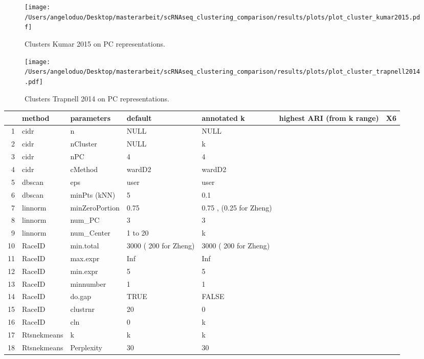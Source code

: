 \documentclass[11pt, a4paper]{article}\usepackage[]{graphicx}\usepackage[]{color}
\begin{document}
\begin{figure}[!h]
\texttt{[image: /Users/angeloduo/Desktop/masterarbeit/scRNAseq\_clustering\_comparison/results/plots/plot\_cluster\_kumar2015.pdf]}
\caption{Clusters Kumar 2015 on PC representations. }
\label{fig:clusterkumar}
\end{figure}

\begin{figure}[!h]
\texttt{[image: /Users/angeloduo/Desktop/masterarbeit/scRNAseq\_clustering\_comparison/results/plots/plot\_cluster\_trapnell2014.pdf]}
\caption{Clusters Trapnell 2014 on PC representations. }
\label{fig:clustertrapnell}
\end{figure}

\clearpage
\begin{table}[ht]
\centering
\begin{tabular}{rllllll}
  \hline
 & method & parameters & default & annotated k & highest ARI (from k range) & X6 \\ 
  \hline
1 & cidr & n & NULL & NULL &  &  \\ 
  2 & cidr & nCluster & NULL & k &  &  \\ 
  3 & cidr & nPC & 4 & 4 &  &  \\ 
  4 & cidr & cMethod & wardD2 & wardD2 &  &  \\ 
  5 & dbscan & eps & user & user &  &  \\ 
  6 & dbscan & minPts (kNN) & 5 & 0.1 &  &  \\ 
  7 & linnorm & minZeroPortion & 0.75 & 0.75 , (0.25 for Zheng) &  &  \\ 
  8 & linnorm & num\_PC & 3 & 3 &  &  \\ 
  9 & linnorm & num\_Center & 1 to 20 & k &  &  \\ 
  10 & RaceID & min.total & 3000 ( 200 for Zheng) & 3000 ( 200 for Zheng) &  &  \\ 
  11 & RaceID & max.expr & Inf & Inf &  &  \\ 
  12 & RaceID & min.expr & 5 & 5 &  &  \\ 
  13 & RaceID & minnumber & 1 & 1 &  &  \\ 
  14 & RaceID & do.gap & TRUE & FALSE &  &  \\ 
  15 & RaceID & clustrnr & 20 & 0 &  &  \\ 
  16 & RaceID & cln & 0 & k &  &  \\ 
  17 & Rtsnekmeans & k & k & k &  &  \\ 
  18 & Rtsnekmeans & Perplexity & 30 & 30 &  &  \\ 

\end{tabular}
\end{table}
\end{document}
